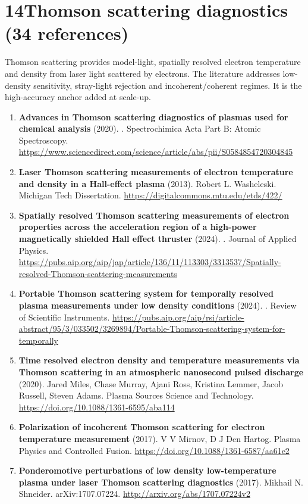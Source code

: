 \documentclass[11pt,a4paper]{article}
\begin{document}
\section*{14\quad Thomson scattering diagnostics \textnormal{(\normalsize 34 references)}}
Thomson scattering provides model-light, spatially resolved electron temperature and density from laser light scattered by electrons. The literature addresses low-density sensitivity, stray-light rejection and incoherent/coherent regimes. It is the high-accuracy anchor added at scale-up.
\begin{enumerate}[leftmargin=1.4em]
\item \textbf{Advances in Thomson scattering diagnostics of plasmas used for chemical analysis} (2020). . Spectrochimica Acta Part B: Atomic Spectroscopy. \url{https://www.sciencedirect.com/science/article/abs/pii/S0584854720304845}
\item \textbf{Laser Thomson scattering measurements of electron temperature and density in a Hall-effect plasma} (2013). Robert L. Washeleski. Michigan Tech Dissertation. \url{https://digitalcommons.mtu.edu/etds/422/}
\item \textbf{Spatially resolved Thomson scattering measurements of electron properties across the acceleration region of a high-power magnetically shielded Hall effect thruster} (2024). . Journal of Applied Physics. \url{https://pubs.aip.org/aip/jap/article/136/11/113303/3313537/Spatially-resolved-Thomson-scattering-measurements}
\item \textbf{Portable Thomson scattering system for temporally resolved plasma measurements under low density conditions} (2024). . Review of Scientific Instruments. \url{https://pubs.aip.org/aip/rsi/article-abstract/95/3/033502/3269894/Portable-Thomson-scattering-system-for-temporally}
\item \textbf{Time resolved electron density and temperature measurements via Thomson scattering in an atmospheric nanosecond pulsed discharge} (2020). Jared Miles, Chase Murray, Ajani Ross, Kristina Lemmer, Jacob Russell, Steven Adams. Plasma Sources Science and Technology. \url{https://doi.org/10.1088/1361-6595/aba114}
\item \textbf{Polarization of incoherent Thomson scattering for electron temperature measurement} (2017). V V Mirnov, D J Den Hartog. Plasma Physics and Controlled Fusion. \url{https://doi.org/10.1088/1361-6587/aa61e2}
\item \textbf{Ponderomotive perturbations of low density low-temperature plasma under laser Thomson scattering diagnostics} (2017). Mikhail N. Shneider. arXiv:1707.07224. \url{http://arxiv.org/abs/1707.07224v2}

\end{enumerate}
\end{document}
